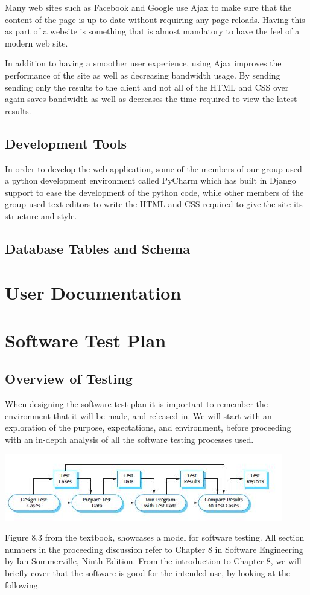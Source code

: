 \documentclass[11pt]{article}
\begin{document}
Many web sites such as Facebook and Google use Ajax to make sure that
the content of the page is up to date without requiring any page
reloads. Having this as part of a website is something that is almost
mandatory to have the feel of a modern web site.

In addition to having a smoother user experience, using Ajax improves
the performance of the site as well as decreasing bandwidth usage. By
sending sending only the results to the client and not all of the HTML
and CSS over again saves bandwidth as well as decreases the time
required to view the latest results. 

\subsection{Development Tools}

In order to develop the web application, some of the members of our
group used a python development environment called PyCharm which has
built in Django support to ease the development of the python
code, while other members of the group used text editors to write the
HTML and CSS required to give the site its structure and style.


\subsection{Database Tables and Schema}

\section{User Documentation}

\section{Software Test Plan}
	\subsection{Overview of Testing}
		When designing the software test plan it is important to remember the environment that it will be made, and released in.
		We will start with an exploration of the purpose, expectations, and environment, before proceeding with an in-depth analysis of all the software testing processes used. \\
		\centerline{\includegraphics[scale=0.75]{./images/testProcesses}} 
		Figure 8.3 from the textbook, showcases a model for software testing.
		All section numbers in the proceeding discussion refer to Chapter 8 in Software Engineering by Ian Sommerville, Ninth Edition.
		From the introduction to Chapter 8, we will briefly cover that the software is good for the intended use, by looking at the following.
\end{document}
